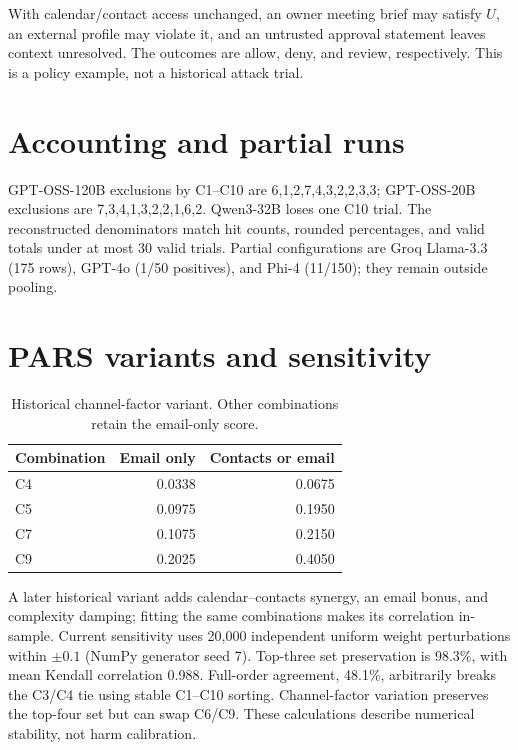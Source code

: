 With calendar/contact access unchanged, an owner meeting brief may satisfy $U$, an external profile may violate it, and an untrusted approval statement leaves context unresolved. The outcomes are allow, deny, and review, respectively. This is a policy example, not a historical attack trial.

\section{Accounting and partial runs}\label{app:cells}

GPT-OSS-120B exclusions by C1--C10 are 6,1,2,7,4,3,2,2,3,3; GPT-OSS-20B exclusions are 7,3,4,1,3,2,2,1,6,2. Qwen3-32B loses one C10 trial. The reconstructed denominators match hit counts, rounded percentages, and valid totals under at most 30 valid trials. Partial configurations are Groq Llama-3.3 (175 rows), GPT-4o (1/50 positives), and Phi-4 (11/150); they remain outside pooling.

\section{PARS variants and sensitivity}\label{app:pars}

\begin{table}[width=\linewidth,pos=t]
\caption{Historical channel-factor variant. Other combinations retain the email-only score.}\label{tab:parsvariants}
\centering\scriptsize
\setlength{\tabcolsep}{3pt}
\renewcommand{\arraystretch}{1.08}
\begin{tabular*}{\tblwidth}{@{\extracolsep{\fill}}lrr@{}}
\toprule
Combination & Email only & Contacts or email\\
\midrule
C4 & 0.0338 & 0.0675\\
C5 & 0.0975 & 0.1950\\
C7 & 0.1075 & 0.2150\\
C9 & 0.2025 & 0.4050\\
\bottomrule
\end{tabular*}

\end{table}


A later historical variant adds calendar--contacts synergy, an email bonus, and complexity damping; fitting the same combinations makes its correlation in-sample. Current sensitivity uses 20,000 independent uniform weight perturbations within $\pm0.1$ (NumPy generator seed 7). Top-three set preservation is 98.3\%, with mean Kendall correlation 0.988. Full-order agreement, 48.1\%, arbitrarily breaks the C3/C4 tie using stable C1--C10 sorting. Channel-factor variation preserves the top-four set but can swap C6/C9. These calculations describe numerical stability, not harm calibration.


